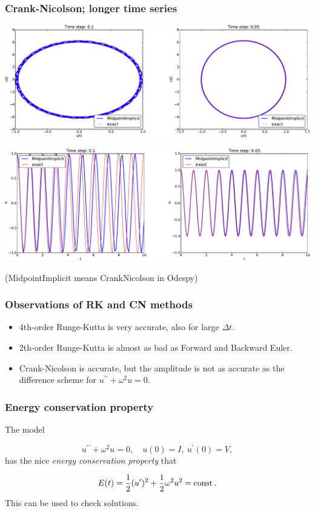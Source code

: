 \documentclass{beamer}
\begin{document}
\begin{frame}
\frametitle{Crank-Nicolson; longer time series}

\centerline{\includegraphics[width=1.0\linewidth]{fig-vib/vib_CN_10_pp.pdf}}





\centerline{\includegraphics[width=1.0\linewidth]{fig-vib/vib_CN_10_u.pdf}}



(MidpointImplicit means CrankNicolson in Odespy)
\end{frame}

\begin{frame}
\frametitle{Observations of RK and CN methods}

\begin{itemize}
  \item 4th-order Runge-Kutta is very accurate, also for large $\Delta t$.

  \item 2th-order Runge-Kutta is almost as bad as Forward and Backward
    Euler.

  \item Crank-Nicolson is accurate, but the amplitude is not as accurate
    as the difference scheme for $u^{\prime\prime}+\omega^2u=0$.
\end{itemize}

\noindent
\end{frame}

\begin{frame}
\frametitle{Energy conservation property}

The model

\[ u^{\prime\prime} + \omega^2 u = 0,\quad u(0)=I,\ u^{\prime}(0)=V,\]
has the nice \emph{energy conservation property} that

\[ E(t) = \half(u^{\prime})^2 + \half\omega^2u^2 = \hbox{const}\tp\]
This can be used to check solutions.
\end{frame}
\end{document}
